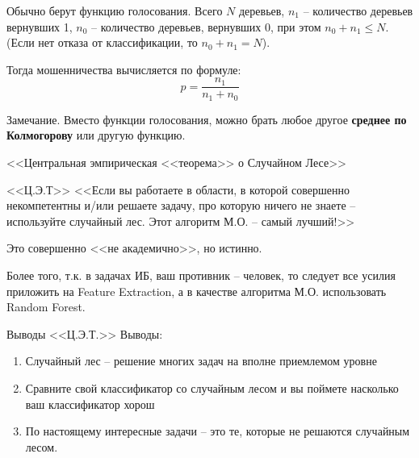 \begin{frame}
	Обычно берут функцию голосования. 
	Всего $N$ деревьев, 
	$n_1$ -- количество деревьев вернувших 1,
	$n_0$ -- количество деревьев, вернувших 0,
	при этом $n_0 + n_1 \leqslant N$. 
	(Если нет отказа от классификации, то $n_0 + n_1 = N$).
	
	Тогда  мошенничества
	вычисляется по формуле:
	\begin{equation}
	p = \frac{n_1}{n_1+n_0}
	\end{equation}
	
	\begin{block}{Замечание.}
	Вместо функции голосования, можно брать любое другое 
	\textbf{среднее по Колмогорову} или другую функцию.
	\end{block}
\end{frame}

\begin{frame}{<<Центральная эмпирическая <<теорема>> о Случайном Лесе>>}
	\begin{block}{<<Ц.Э.Т>>}
	<<Если вы работаете в области,
	в которой совершенно некомпетентны
	и/или решаете задачу, про которую ничего не знаете --
	используйте случайный лес.
	Этот алгоритм М.О. -- самый лучший!>>
	\end{block}
	Это совершенно <<не академично>>, но истинно.
	
	Более того, т.к. в задачах ИБ, ваш противник --
	человек, то следует все усилия приложить на 
	Feature Extraction, а в качестве алгоритма М.О.
	использовать Random Forest. 
\end{frame}

\begin{frame}{Выводы <<Ц.Э.Т.>>}
	Выводы: 
	\begin{enumerate}
	\item Случайный лес -- решение многих 
	задач на вполне приемлемом уровне
	\item Сравните свой классификатор со случайным лесом 
	и вы поймете насколько ваш классификатор хорош
	\item По настоящему интересные задачи -- это те,
	которые не решаются случайным лесом.
	\end{enumerate}
\end{frame}

